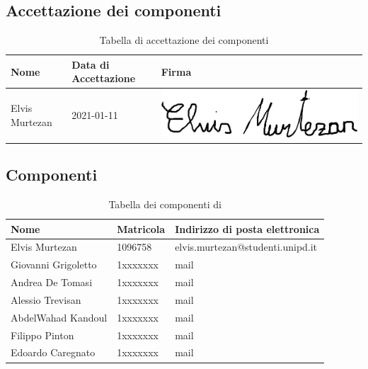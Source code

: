 \subsection{Accettazione dei componenti}
{
	\renewcommand{\arraystretch}{2}
	\begin{longtable}{ C{5cm} C{4cm} C{5cm} }
		\caption{Tabella di accettazione dei componenti}\\
		\rowcolor{\primaryColor}
		\textcolor{\secondaryColor}{\textbf{Nome}} & \textcolor{\secondaryColor}{\textbf{Data di Accettazione}} & \textcolor{\secondaryColor}{\textbf{Firma}}\\	\endhead
        {Elvis Murtezan} & 2021-01-11 & \includegraphics[scale=0.20]{./src/Organigramma/immagini/firme/Elvis.png}\\

	\end{longtable}
}


\subsection{Componenti}
{
    \renewcommand{\arraystretch}{2}
	\begin{longtable}{ C{4cm} C{2cm} C{8cm} }
		\caption{Tabella dei componenti di \Gruppo{}}\\
		\rowcolor{\primaryColor}
        \textcolor{\secondaryColor}{\textbf{Nome}} & \textcolor{\secondaryColor}{\textbf{Matricola}} & \textcolor{\secondaryColor}{\textbf{Indirizzo di posta elettronica}}\\\endhead	
        {Elvis Murtezan} & 1096758 & {elvis.murtezan@studenti.unipd.it}\\   
        {Giovanni Grigoletto} & 1xxxxxxx & {mail}\\    
        {Andrea De Tomasi} & 1xxxxxxx & {mail}\\    
        {Alessio Trevisan} & 1xxxxxxx & {mail}\\    
        {AbdelWahad Kandoul} & 1xxxxxxx & {mail} \\    
        {Filippo Pinton} & 1xxxxxxx & {mail}\\    
        {Edoardo Caregnato} & 1xxxxxxx & {mail}\\       
	\end{longtable}
}